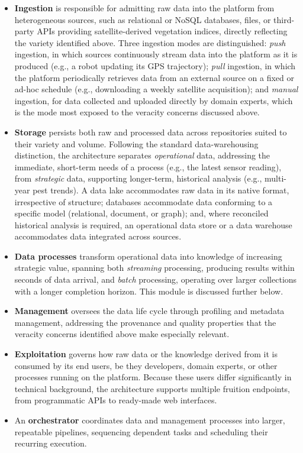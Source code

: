 \begin{itemize}
    \item \textbf{Ingestion} is responsible for admitting raw data into the platform from heterogeneous sources, such as relational or NoSQL databases, files, or third-party APIs providing satellite-derived vegetation indices, directly reflecting the variety identified above. Three ingestion modes are distinguished: \emph{push} ingestion, in which sources continuously stream data into the platform as it is produced (e.g., a robot updating its GPS trajectory); \emph{pull} ingestion, in which the platform periodically retrieves data from an external source on a fixed or ad-hoc schedule (e.g., downloading a weekly satellite acquisition); and \emph{manual} ingestion, for data collected and uploaded directly by domain experts, which is the mode most exposed to the veracity concerns discussed above.
    \item \textbf{Storage} persists both raw and processed data across repositories suited to their variety and volume. Following the standard data-warehousing distinction, the architecture separates \emph{operational} data, addressing the immediate, short-term needs of a process (e.g., the latest sensor reading), from \emph{strategic} data, supporting longer-term, historical analysis (e.g., multi-year pest trends). A data lake accommodates raw data in its native format, irrespective of structure; databases accommodate data conforming to a specific model (relational, document, or graph); and, where reconciled historical analysis is required, an operational data store or a data warehouse accommodates data integrated across sources.
    \item \textbf{Data processes} transform operational data into knowledge of increasing strategic value, spanning both \emph{streaming} processing, producing results within seconds of data arrival, and \emph{batch} processing, operating over larger collections with a longer completion horizon. This module is discussed further below.
    \item \textbf{Management} oversees the data life cycle through profiling and metadata management, addressing the provenance and quality properties that the veracity concerns identified above make especially relevant.
    \item \textbf{Exploitation} governs how raw data or the knowledge derived from it is consumed by its end users, be they developers, domain experts, or other processes running on the platform. Because these users differ significantly in technical background, the architecture supports multiple fruition endpoints, from programmatic APIs to ready-made web interfaces.
    \item An \textbf{orchestrator} coordinates data and management processes into larger, repeatable pipelines, sequencing dependent tasks and scheduling their recurring execution.
\end{itemize}

